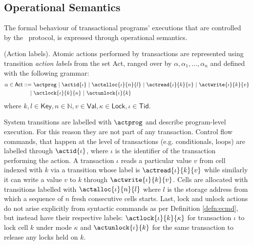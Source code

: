 \subsection{Operational Semantics}

\label{sec:2plSemantics}

The formal behaviour of transactional programs' executions that are controlled by the \tpl\ protocol, is expressed through operational semantics.

\begin{defn}
	(Action labels).
	Atomic actions performed by transactions are represented using transition \emph{action labels} from the set \textsf{Act}, ranged over by $\alpha, \alpha_1, \ldots, \alpha_n$ and defined with the following grammar:
	\begin{align*}
		\alpha \in \mathsf{Act} ::=
		\ &\actprog\
		|\ \actid{\iota}\
		|\ \actalloc{\iota}{n}{l}\
		|\ \actread{\iota}{k}{v}\
		|\ \actwrite{\iota}{k}{v}\\
		|\ &\actlock{\iota}{k}{\kappa}\
		|\ \actunlock{\iota}{k}
	\end{align*}
	where $k, l \in \mathsf{Key}, n \in \mathds{N}, v \in \mathsf{Val}, \kappa \in \mathsf{Lock}, \iota \in \mathsf{Tid}$.
\end{defn}

System transitions are labelled with $\actprog$ and describe program-level execution. For this reason they are not part of any transaction. Control flow commands, that happen at the level of transactions (e.g. conditionals, loops) are labelled through $\actid{\iota}$, where $\iota$ is the identifier of the transaction performing the action. A transaction $\iota$ reads a particular value $v$ from cell indexed with $k$ via a transition whose label is $\actread{\iota}{k}{v}$ while similarly it can write a value $v$ to $k$ through $\actwrite{\iota}{k}{v}$. Cells are allocated with transitions labelled with $\actalloc{\iota}{n}{l}$ where $l$ is the storage address from which a sequence of $n$ fresh consecutive cells starts. Last, lock and unlock actions do not arise explicitly from syntactic commands as per Definition \ref{defn:ecmd}, but instead have their respective labels: $\actlock{\iota}{k}{\kappa}$ for transaction $\iota$ to lock cell $k$ under mode $\kappa$ and $\actunlock{\iota}{k}$ for the same transaction to release any locks held on $k$.


